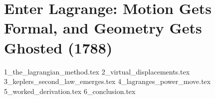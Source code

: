 \section{Enter Lagrange: Motion Gets Formal, and Geometry Gets Ghosted (1788)}


{1_the_lagrangian_method.tex}
{2_virtual_displacements.tex}
{3_keplers_second_law_emerges.tex}
{4_lagranges_power_move.tex}
{5_worked_derivation.tex}
{6_conclusion.tex}